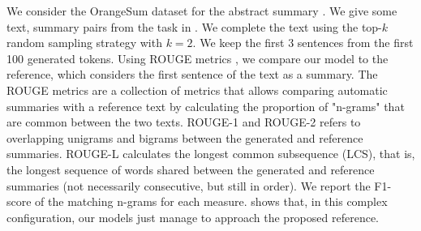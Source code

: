 \begin{table}[!ht]
\footnotesize
{}
\caption{Comparison of the generated abstracts with the title of the article or the proposed synthesis. We use the ROUGE score and the OrangeSum corpus \parencite{kamal_20}. Our models are used in learning without examples and thus without updating the parameters on the training set. We indicate the best results in \textbf{bold}. We report the F1-score for each ROUGE measure.}
\end{table}

We consider the OrangeSum dataset for the abstract summary \parencite{kamal_20}. We give some text, summary pairs from the task in .
We complete the text using the top-$k$ random sampling strategy \parencite{lewis_18} with $k=2$. We keep the first 3 sentences from the first 100 generated tokens. Using ROUGE metrics \parencite{lin2004rouge}, we compare our model to the reference, which considers the first sentence of the text as a summary. The ROUGE metrics are a collection of metrics that allows comparing automatic summaries with a reference text by calculating the proportion of "n-grams" that are common between the two texts. ROUGE-1 and ROUGE-2 refers to overlapping unigrams and bigrams between the generated and reference summaries. ROUGE-L calculates the longest common subsequence (LCS), that is, the longest sequence of words shared between the generated and reference summaries (not necessarily consecutive, but still in order). We report the F1-score of the matching n-grams for each measure.  shows that, in this complex configuration, our models just manage to approach the proposed reference.

